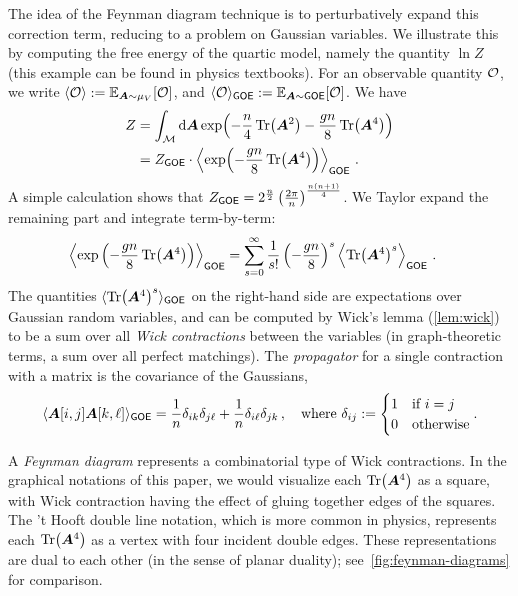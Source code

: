 The idea of the Feynman diagram technique is to perturbatively expand this correction
term, reducing to a problem on Gaussian variables.
We illustrate this by computing
the free energy
of the quartic model, namely the quantity $\ln Z$ (this example can be found in physics textbooks).
For an observable quantity ${\cal O}$,
we write 
$\langle {\cal O} \rangle := \operatorname*{\mathbb{E}}_{{\bm A} \sim \mu_V}[{\cal O}]$, and 
$\langle {\cal O} \rangle_{\textsf{\upshape GOE}} := \operatorname*{\mathbb{E}}_{{\bm A} \sim \textsf{\upshape GOE}}[{\cal O}]$.
We have
\begin{align*}
    Z &= \int_{{\cal M}}{\textnormal d}{\bm A} \exp(-\frac n4 \Tr({\bm A}^2) - \frac{gn}{8}  \Tr({\bm A}^4))\\
    &= Z_\textsf{\upshape GOE}\cdot \left\langle \exp(-\frac{gn}{8} \Tr({\bm A}^4))\right\rangle_\textsf{\upshape GOE}\,.
\end{align*}
A simple calculation shows that $Z_\textsf{\upshape GOE} = 2^{\frac{n}{2}}\left(\frac{2\pi}{n}\right)^{\frac{n(n+1)}{4}}$. We Taylor expand the remaining part and integrate term-by-term:
\begin{align}
    \left\langle \exp\left(-\frac{gn}8 \Tr({\bm A}^4)\right)\right\rangle_\textsf{\upshape GOE} &= \sum_{s = 0}^\infty \frac{1}{s!}\left(-\frac{gn}8 \right)^s\left\langle\Tr({\bm A}^4)^s\right\rangle_\textsf{\upshape GOE}\,. \label{eq:taylor-exp}
\end{align}
The quantities $\langle \Tr({\bm A}^4)^s\rangle_\textsf{\upshape GOE}$ on the right-hand side are expectations over Gaussian random variables, and can be computed by Wick's lemma (\cref{lem:wick}) to be a sum over all \emph{Wick contractions} between the variables (in graph-theoretic terms, a sum over all perfect matchings).
The \emph{propagator} for a single contraction with a \goe matrix is
the covariance of the Gaussians,
\begin{equation}\label{eq:propagator}
    \langle{\bm A}[i,j]{\bm A}[k,\ell]\rangle_\textsf{\upshape GOE} = \frac 1n \delta_{ik}\delta_{j\ell} + \frac 1n \delta_{i\ell}\delta_{jk}\,,\quad \textnormal{where $\delta_{ij} := \begin{cases}1 & \textnormal{if $i=j$}\\0 & \textnormal{otherwise}\end{cases}$}\,.
\end{equation}

A \emph{Feynman diagram} represents a combinatorial type of Wick contractions.
In the graphical notations of this paper, we would visualize each $\Tr({\bm A}^4)$ as a square, with Wick contraction having the effect of gluing together edges of the squares.
The 't Hooft double line notation, which is more common in physics, represents each $\Tr({\bm A}^4)$ as a vertex with four incident double edges.
These representations are dual
to each other (in the sense of planar
duality); see~\cref{fig:feynman-diagrams} for comparison.

